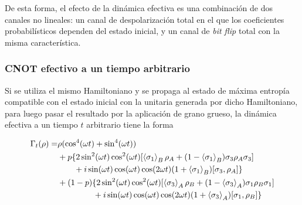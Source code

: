 De esta forma, el efecto de la dinámica efectiva es una combinación de dos canales no lineales: un canal de despolarización total en el que los coeficientes probabilísticos dependen del estado inicial, y un canal de \textit{bit flip} total con la misma característica. 

\subsubsection{CNOT efectivo a un tiempo arbitrario}

Si se utiliza el mismo Hamiltoniano y se propaga al estado de máxima entropía compatible con el estado inicial con la unitaria generada por dicho Hamiltoniano, para luego pasar el resultado por la aplicación de grano grueso, la dinámica efectiva a un tiempo $t$ arbitrario tiene la forma

\begin{align*}
  \Gamma_{t}(\rho)=&\rho(\cos^{4}(\omega t)+\sin^{4}(\omega t))\\
  &+p\{2\sin^{2}(\omega t)\cos^{2}(\omega
  t)\qty[\expval{\sigma_{1}}_{B}\rho_{A}+(1-\expval{\sigma_{1}}_{B})\sigma_{3}\rho_{A}\sigma_{3}]\\
  & \ \ \ \ \ \ +i\sin(\omega t)\cos(\omega t)\cos(2\omega t)(1+\expval{\sigma_{1}}_{B})[\sigma_{3},\rho_{A}]\}\\
  &+(1-p)\{2\sin^{2}(\omega t)\cos^{2}(\omega t)\qty[\expval{\sigma_{3}}_{A}\rho_{B}+(1-\expval{\sigma_{3}}_{A})\sigma_{1}\rho_{B}\sigma_{1}]\\
  &\ \ \ \ \ \ \ \ \ \ \ \ \ +i\sin(\omega t)\cos(\omega t)\cos(2\omega t)(1+\expval{\sigma_{3}}_{A})[\sigma_{1},\rho_{B}]\}
\end{align*} 

